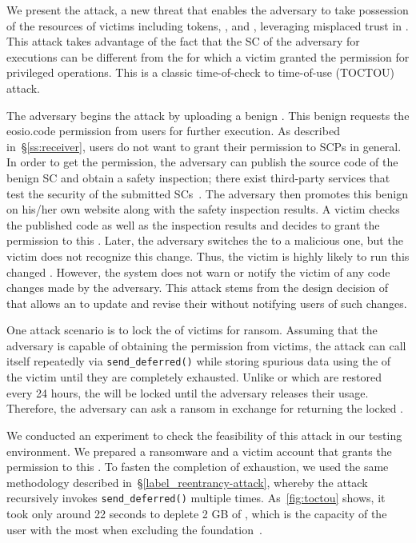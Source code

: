 We present the \textit{\TOCTOU} attack, a new threat that enables the adversary
to take possession of the resources of victims including \EOS tokens, \cpu, and
\ram, leveraging misplaced trust in \SCs. This attack takes advantage of the
fact that the SC of the adversary for executions can be different from the \SC
for which a victim granted the \code permission for privileged operations. This
is a classic time-of-check to time-of-use (TOCTOU) attack.

The adversary begins the attack by uploading a benign \SC. This benign \SC
requests the eosio.code permission from users for further execution.
%
As described in~\S\ref{ss:receiver}, users do not want to grant their permission
to SCPs in general.
%
In order to get the \code permission, the adversary can publish the source code
of the benign SC and obtain a safety inspection; there exist third-party
services that test the security of the submitted SCs~\cite{eospark}.
%
The adversary then promotes this benign \SC on his/her own website along with
the safety inspection results. A victim checks the published code as well as the
inspection results and decides to grant the permission to this \SC.
%
Later, the adversary switches the \SC to a malicious one, but the victim does
not recognize this change.
%
Thus, the victim is highly likely to run this changed \SC.
%
However, the \PLATFORM system does not warn or notify the victim of any code
changes made by the adversary.
%
This attack stems from the design decision of \PLATFORM that allows an \SCP to
update and revise their \SC without notifying users of such \SC changes.

One attack scenario is to lock the \ram of victims for ransom. Assuming that the
adversary is capable of obtaining the \code permission from victims, the attack
\SC can call itself repeatedly via \texttt{send\_deferred()} while storing
spurious data using the \ram of the victim until they are completely exhausted.
Unlike \cpu or \net which are restored every 24 hours, the \ram will be locked
until the adversary releases their usage. Therefore, the adversary can ask a
ransom in exchange for returning the locked \ram.

We conducted an experiment to check the feasibility of this attack in our
testing environment. We prepared a ransomware \SC and a victim account that
grants the \code permission to this \SC.
%
To fasten the completion of \ram exhaustion, we used the same methodology
described in~\S\ref{label_reentrancy-attack}, whereby the attack \SC recursively
invokes \texttt{send\_deferred()} multiple times. As~\autoref{fig:toctou} shows,
it took only around 22 seconds to deplete 2 GB of \ram, which is the \ram
capacity of the user with the most \ram when excluding the \eos
foundation~\cite{eospark}.



